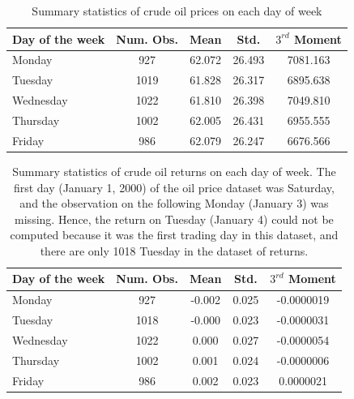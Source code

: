 \documentclass[12pt]{article}
\begin{document}
	\begin{table}[H]
		\small
		\center
		\begin{tabular}{|l|c c c c|}
			\hline
			Day of the week & Num. Obs. & Mean & Std. & $3^{rd}$ Moment \\
			\hline
			Monday & 927 & 62.072 & 26.493 & 7081.163 \\
			Tuesday & 1019 & 61.828 & 26.317 & 6895.638 \\
			Wednesday & 1022 & 61.810 & 26.398 & 7049.810 \\
			Thursday & 1002 & 62.005 & 26.431 & 6955.555 \\
			Friday & 986 & 62.079 & 26.247 & 6676.566 \\
			\hline
		\end{tabular}
		\caption{Summary statistics of crude oil prices on each day of week}
	\end{table}

	\begin{table}[H]
		\small
		\center
		\begin{tabular}{|l|c c c c|}
			\hline
			Day of the week & Num. Obs. & Mean & Std. & $3^{rd}$ Moment \\
			\hline
			Monday & 927 & -0.002 & 0.025 & -0.0000019 \\
			Tuesday & 1018 & -0.000 & 0.023 & -0.0000031 \\
			Wednesday & 1022 & 0.000 & 0.027 & -0.0000054 \\
			Thursday & 1002 & 0.001 & 0.024 & -0.0000006 \\
			Friday & 986 & 0.002 & 0.023 & 0.0000021 \\
			\hline
		\end{tabular}
		\caption{Summary statistics of crude oil returns on each day of week. The first day (January 1, 2000) of the oil price dataset was Saturday, and the observation on the following Monday (January 3) was missing. Hence, the return on Tuesday (January 4) could not be computed because it was the first trading day in this dataset, and there are only 1018 Tuesday in the dataset of returns.}
	\end{table}
	
\end{document}
